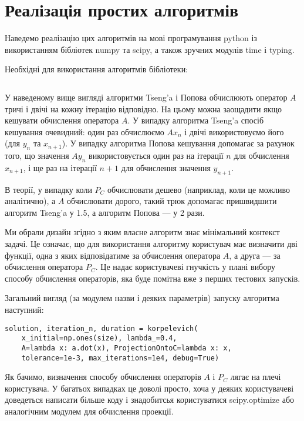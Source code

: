 \chapter{Реалізація простих алгоритмів}

Наведемо реалізацію цих алгоритмів на мові програмування python із використанням бібліотек numpy та scipy, а також зручних модулів time і typing. \medskip

Необхідні для використання алгоритмів бібліотеки:
\inputminted[linenos,fontsize=\tiny]{python}{src/__init__.py}

\begin{remark}
    У наведеному вище вигляді алгоритми Tseng'a і Попова обчислюють оператор $A$ тричі і двічі на кожну ітерацію відповідно. На цьому можна заощадити якщо кешувати обчислення оператора $A$. У випадку алгоритма Tseng'a спосіб кешування очевидний: один раз обчислюємо $A x_n$ і двічі використовуємо його (для $y_n$ та $x_{n + 1}$). У випадку алгоритма Попова кешування допомагає за рахунок того, що значення $A y_n$ використовується один раз на ітерації $n$ для обчислення $x_{n + 1}$, і ще раз на ітерації $n + 1$ для обчислення значення $y_{n + 1}$. \medskip
    
    В теорії, у випадку коли $P_C$ обчислювати дешево (наприклад, коли це можливо аналітично), а $A$ обчислювати дорого, такий трюк допомагає пришвидшити алгоритм Tseng'a у 1.5, а алгоритм Попова --- у 2 рази.
\end{remark}

\begin{remark}
    Ми обрали дизайн згідно з яким власне алгоритм знає мінімальний контекст задачі. Це означає, що для використання алгоритму користувач має визначити дві функції, одна з яких відповідатиме за обчислення оператора $A$, а друга --- за обчислення оператора $P_C$. Це надає користувачеві гнучкість у плані вибору способу обчислення операторів, яка буде помітна вже з перших тестових запусків.
\end{remark}

Загальний вигляд (за модулем назви і деяких параметрів) запуску алгоритма наступний:
\begin{verbatim}
solution, iteration_n, duration = korpelevich(
    x_initial=np.ones(size), lambda_=0.4,
    A=lambda x: a.dot(x), ProjectionOntoC=lambda x: x,
    tolerance=1e-3, max_iterations=1e4, debug=True)
\end{verbatim}

Як бачимо, визначення способу обчислення операторів $A$ і $P_C$ лягає на плечі користувача. У багатьох випадках це доволі просто, хоча у деяких користувачеві доведеться написати більше коду і знадобитсья користуватися scipy.optimize або  аналогічним модулем для обчислення проекції.

